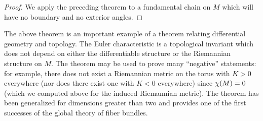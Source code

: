 \documentclass[../main]{subfiles}
\begin{document}
\begin{proof}
We apply the preceding theorem to a fundamental chain on $M$ which will have no boundary and no exterior angles.
\end{proof}



The above theorem is an important example of a theorem relating differential geometry and topology. The Euler characteristic is a topological invariant which does not depend on either the differentiable structure or the Riemannian structure on $M.$ The theorem may be used to prove many ``negative'' statements: for example, there does not exist a Riemannian metric on the torus with $K>0$ everywhere (nor does there exist one with $K<0$ everywhere) since $\chi(M)=0$ (which we computed above for the induced Riemannian metric). The theorem has been generalized for dimensions greater than two and provides one of the first successes of the global theory of fiber bundles.
\end{document}
